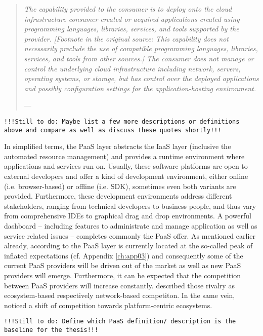 \begin{quotation}{\slshape 
The capability provided to the consumer is to deploy onto the cloud infrastructure consumer-created or acquired applications created using programming languages, libraries, services, and tools supported by the provider. [Footnote in the original source: This capability does not necessarily preclude the use of compatible programming languages, libraries, services, and tools from other sources.] The consumer does not manage or control the underlying cloud infrastructure including network, servers, operating systems, or storage, but has control over the deployed applications and possibly configuration settings for the application-hosting environment.}
\vspace*{-7pt}
\begin{flushright}
	--- \citealp[pp. 2-3]{Mell2011}
\end{flushright}
\end{quotation}

\texttt{!!!Still to do: Maybe list a few more descriptions or definitions above and compare as well as discuss these quotes shortly!!!}

In simplified terms, the \ac{PaaS} layer abstracts the \ac{IaaS} layer (inclusive the automated resource management) and provides a runtime environment where applications and services run on. Usually, these software platforms are open to external developers and offer a kind of development environment, either online (i.e. browser-based) or offline (i.e. \ac{SDK}), sometimes even both variants are provided. Furthermore, these development environments address different stakeholders, ranging from technical developers to business people, and thus vary from comprehensive \acp{IDE} to graphical drag and drop environments. A powerful dashboard -- including features to administrate and manage application as well as service related issues -- completes commonly the \ac{PaaS} offer.
As mentioned earlier already, according to \citet[p. 5]{Smith2012} the \ac{PaaS} layer is currently located at the so-called peak of inflated expectations (cf. Appendix \ref{ch:app03}) and consequently some of the current \ac{PaaS} providers will be driven out of the market as well as new \ac{PaaS} providers will emerge. Furthermore, it can be expected that the competition between \ac{PaaS} providers will increase constantly. \citet[pp. 117,128-129]{Iyer2010} described those rivalry as ecosystem-based respectively network-based competiton. In the same vein, \citet[pp. 675-676]{Tiwana2010} noticed a shift of competition towards platform-centric ecosystems.

\texttt{!!!Still to do: Define which PaaS definition/ description is the baseline for the thesis!!!}